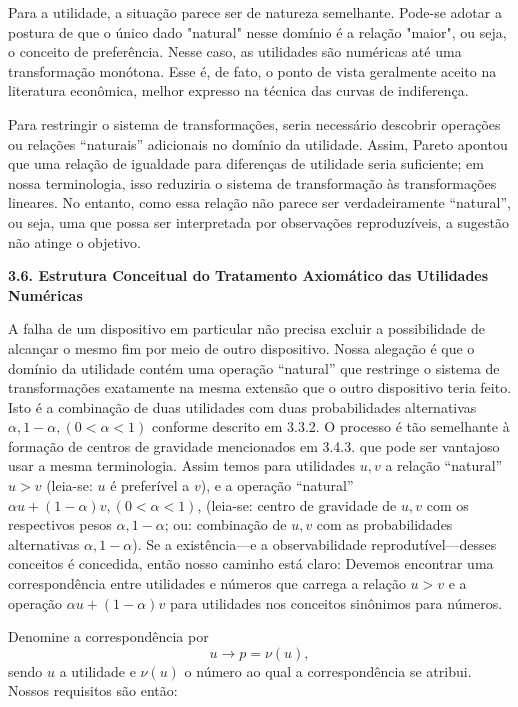 \documentclass[a4paper,12pt]{article}[abntex2]
\begin{document}
Para a utilidade, a situação parece ser de natureza semelhante. Pode-se adotar a postura de que o único dado "natural" nesse domínio é a relação "maior", ou seja, o conceito de preferência. Nesse caso, as utilidades são numéricas até uma transformação monótona. Esse é, de fato, o ponto de vista geralmente aceito na literatura econômica, melhor expresso na técnica das curvas de indiferença.

Para restringir o sistema de transformações, seria necessário descobrir operações ou relações “naturais” adicionais no domínio da utilidade. Assim, Pareto apontou que uma relação de igualdade para diferenças de utilidade seria suficiente; em nossa terminologia, isso reduziria o sistema de transformação às transformações lineares. No entanto, como essa relação não parece ser verdadeiramente “natural”, ou seja, uma que possa ser interpretada por observações reproduzíveis, a sugestão não atinge o objetivo.

\textbf{3.6. Estrutura Conceitual do Tratamento Axiomático das Utilidades Numéricas}

A falha de um dispositivo em particular não precisa excluir a possibilidade de alcançar o mesmo fim por meio de outro dispositivo. Nossa alegação é que o domínio da utilidade contém uma operação ``natural'' que restringe o sistema de transformações exatamente na mesma extensão que o outro dispositivo teria feito. Isto é a combinação de duas utilidades com duas probabilidades alternativas $\alpha, 1 - \alpha, (0 < \alpha < 1)$ conforme descrito em 3.3.2. O processo é tão semelhante à formação de centros de gravidade mencionados em 3.4.3. que pode ser vantajoso usar a mesma terminologia. Assim temos para utilidades $u, v$ a relação ``natural'' $u > v$ (leia-se: $u$ é preferível a $v$), e a operação ``natural'' $\alpha u + (1 - \alpha)v, (0 < \alpha < 1)$, (leia-se: centro de gravidade de $u, v$ com os respectivos pesos $\alpha, 1 - \alpha$; ou: combinação de $u, v$ com as probabilidades alternativas $\alpha, 1 - \alpha$). Se a existência---e a observabilidade reprodutível---desses conceitos é concedida, então nosso caminho está claro: Devemos encontrar uma correspondência entre utilidades e números que carrega a relação $u > v$ e a operação $\alpha u + (1 - \alpha)v$ para utilidades nos conceitos sinônimos para números.

Denomine a correspondência por
\[ u \rightarrow p = \nu(u), \]
sendo $u$ a utilidade e $\nu(u)$ o número ao qual a correspondência se atribui. Nossos requisitos são então:
\end{document}
